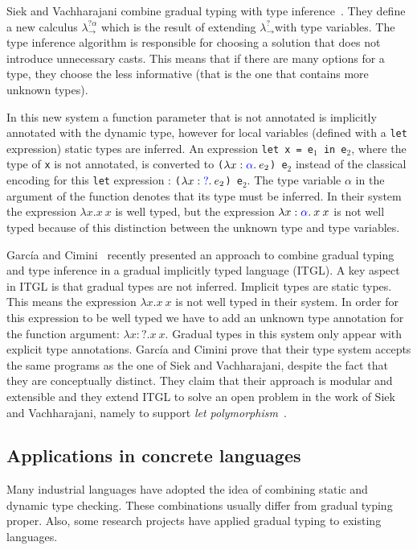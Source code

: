 \documentclass{article}
\newcommand{\tlam}[3]{\lambda #1 : \textcolor[rgb]{0,0,1}{#2}. \: #3}
\newcommand\gstlc[0]{$\lambda^?_{\rightarrow}$}
\newcommand\icode[1]{\texttt{#1}}
\begin{document}
Siek and Vachharajani combine gradual typing with type inference~\cite{siekVachharajani:dls2008}. They define a new calculus $\lambda^{?\alpha}_{\rightarrow}$ which is the result of extending \gstlc with type variables. The type inference algorithm is responsible for choosing a solution that does not introduce unnecessary casts. This means that if there are many options for a type, they choose the less informative (that is the one that contains more unknown types). 

In this new system a function parameter that is not annotated is implicitly annotated with the dynamic type, however for local variables (defined with a \icode{let} expression) static types are inferred. An expression \icode{let x = e$_1$ in e$_2$}, where the type of \icode{x} is not annotated, is converted to \icode{($\tlam{x}{\alpha}{e_2}$) e$_2$} instead of the classical encoding for this \icode{let} expression : \icode{($\tlam{x}{?}{e_2}$) e$_2$}. The type variable $\alpha$ in the argument of the function denotes that its type must be inferred. In their system the expression $\lambda x. x \: x$ is well typed, but the expression $\tlam{x}{\alpha}{x \: x}$ is not well typed because of this distinction between the unknown type and type variables.

Garc{\'i}a and Cimini~\cite{garciaCimini:popl2015} recently presented an approach to combine gradual typing and type inference in a gradual implicitly typed language (ITGL). A key aspect in ITGL is that gradual types are not inferred. Implicit types are static types. This means the expression $\lambda x.x \: x$ is not well typed in their system. In order for this expression to be well typed we have to add an unknown type annotation for the function argument: $\lambda x:?.x \: x$. Gradual types in this system only appear with explicit type annotations. Garc{\'i}a and Cimini prove that their type system accepts the same programs as the one of Siek and Vachharajani, despite the fact that they are conceptually distinct. They claim that their approach is modular and extensible and they extend ITGL to solve an open problem in the work of Siek and Vachharajani, namely to support \emph{let polymorphism}~\cite{milner78}.

\subsection{Applications in concrete languages}\label{sec:gradual_papers}
Many industrial languages have adopted the idea of combining static and dynamic type checking. These combinations usually differ from gradual typing proper. Also, some research projects have applied gradual typing to existing languages.
\end{document}
